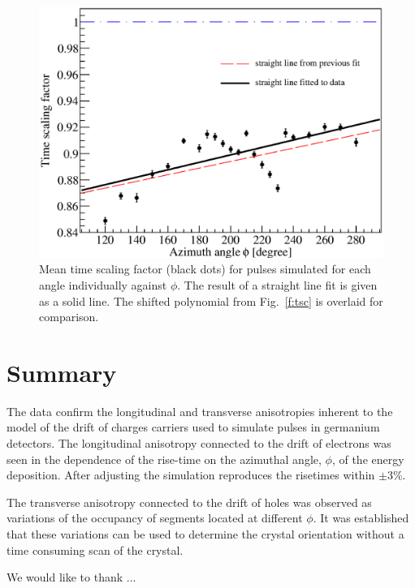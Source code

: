 \documentclass[epj]{svjour}
\begin{document}
\begin{figure}
\includegraphics[width=\linewidth]{tsline}
\caption{Mean time scaling factor (black dots) for pulses simulated
for each angle individually against $\phi$. The result of a straight
line fit is given as a solid line. The shifted polynomial from
Fig.~\ref{f:tsc} is overlaid for comparison.}
\label{f:tsl}
\end{figure}

\section{Summary}
\label{s:sum}
The data confirm the longitudinal and transverse anisotropies inherent
to the model of the drift of charges carriers used to simulate pulses
in germanium detectors.  The longitudinal anisotropy connected to the
drift of electrons was seen in the dependence of the rise-time on the
azimuthal angle, $\phi$, of the energy deposition. After adjusting the
simulation reproduces the risetimes within $\pm$3\%.

The transverse anisotropy connected to the drift of holes was observed
as variations of the occupancy of segments located at different
$\phi$. It was established that these variations can be used to
determine the crystal orientation without a time consuming scan of the
crystal.

\begin{acknowledgement}
We would like to thank ...
\end{acknowledgement}
\end{document}
